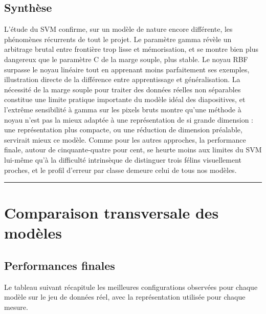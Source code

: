 \documentclass[11pt,a4paper]{report}
\begin{document}
\hypertarget{synthuxe8se-3}{%
\section{Synthèse}\label{synthuxe8se-3}}

L'étude du SVM confirme, sur un modèle de nature encore différente, les
phénomènes récurrents de tout le projet. Le paramètre gamma révèle un
arbitrage brutal entre frontière trop lisse et mémorisation, et se
montre bien plus dangereux que le paramètre C de la marge souple, plus
stable. Le noyau RBF surpasse le noyau linéaire tout en apprenant moins
parfaitement ses exemples, illustration directe de la différence entre
apprentissage et généralisation. La nécessité de la marge souple pour
traiter des données réelles non séparables constitue une limite pratique
importante du modèle idéal des diapositives, et l'extrême sensibilité à
gamma sur les pixels bruts montre qu'une méthode à noyau n'est pas la
mieux adaptée à une représentation de si grande dimension : une
représentation plus compacte, ou une réduction de dimension préalable,
servirait mieux ce modèle. Comme pour les autres approches, la
performance finale, autour de cinquante-quatre pour cent, se heurte
moins aux limites du SVM lui-même qu'à la difficulté intrinsèque de
distinguer trois félins visuellement proches, et le profil d'erreur par
classe demeure celui de tous nos modèles.

\begin{center}\rule{0.5\linewidth}{0.5pt}\end{center}

\hypertarget{comparaison-transversale-des-moduxe8les}{%
\chapter{Comparaison transversale des
modèles}\label{comparaison-transversale-des-moduxe8les}}

\hypertarget{performances-finales}{%
\section{Performances finales}\label{performances-finales}}

Le tableau suivant récapitule les meilleures configurations observées
pour chaque modèle sur le jeu de données réel, avec la représentation
utilisée pour chaque mesure.
\end{document}
